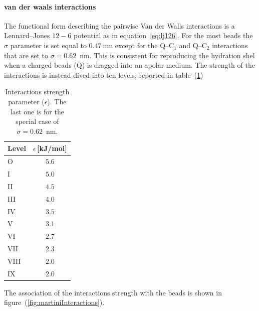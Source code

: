 \paragraph{\textbf{van der waals interactions}} The functional form describing the pairwise Van der Walls interactions is a Lennard--Jones $12-6$ potential as in equation~\eqref{eq:lj126}.
For the most beads the $\sigma$ parameter is set equal to $0.47~$nm except for the Q--C$_1$ and Q--C$_2$ interactions that are set to $\sigma = 0.62$~nm. This is consistent for reproducing the hydration shel when a charged beads (Q) is dragged into an apolar medium. The strength of the interactions is instead dived into ten levels, reported in table~(\ref{tab:martiniEpsilon})
\begin{table}\footnotesize
\begin{tabular}{lc}
	\toprule
	Level  & $\epsilon$\,[kJ/mol] \\ \midrule
	O	   & $5.6$	 \\ \midrule
	I      & $5.0$	 \\ \midrule
	II	   & $4.5$	 \\ \midrule
	III	   & $4.0$	 \\ \midrule
	IV	   & $3.5$	 \\ \midrule
	V	   & $3.1$	 \\ \midrule
	VI	   & $2.7$	 \\ \midrule
	VII	   & $2.3$	 \\ \midrule
	VIII   & $2.0$	 \\ \midrule
	IX     & $2.0$	 \\ \bottomrule
\end{tabular}
\caption{Interactions strength parameter ($\epsilon$). The last one is for the special case of $\sigma=0.62$~nm.}
\label{tab:martiniEpsilon}
\end{table}
The association of the interactions strength with the \martini beads is shown in figure~(\ref{fig:martiniInteractions}).

